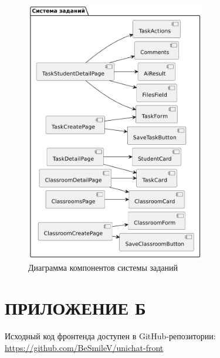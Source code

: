 \begin{figure}[H]
  \centering
  \includegraphics[width=0.7\textwidth]{static/diagrams/ClassroomComponentDiagram.png}
  \caption{Диаграмма компонентов системы заданий}
  \label{fig:classroom-components}
\end{figure}
  
\section*{ПРИЛОЖЕНИЕ Б}

Исходный код фронтенда доступен в GitHub-репозитории:
\href{https://github.com/BeSmileV/unichat-front}{https://github.com/BeSmileV/unichat-front}

